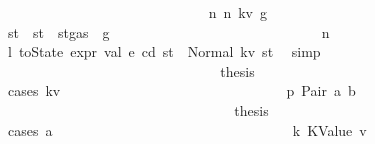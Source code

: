\begin{isabellebody}
\ \ \ \ \ \ \ \ \ \ \ \ \ \ \ \ \ \ \ \ \ \ \ \ \ \ \ \ \isamarkupfalse%
\ n{}{\isacharcolon}{\kern0pt}\ {\isacharparenleft}{\kern0pt}n\ kv\ g{\isacharprime}{\kern0pt}{\isacharprime}{\kern0pt}{\isacharparenright}{\kern0pt}\isanewline
\ \ \ \ \ \ \ \ \ \ \ \ \ \ \ \ \ \ \ \ \ \ \ \ \ \ \ \ \isamarkupfalse%
\ st{\isacharprime}{\kern0pt}{\isacharprime}{\kern0pt}{\isacharprime}{\kern0pt}\ \ {\isachardoublequoteopen}st{\isacharprime}{\kern0pt}{\isacharprime}{\kern0pt}{\isacharprime}{\kern0pt}\ {\isacharequal}{\kern0pt}\ st{\isacharprime}{\kern0pt}{\isacharprime}{\kern0pt}{\isasymlparr}gas\ {\isacharcolon}{\kern0pt}{\isacharequal}{\kern0pt}\ g{\isacharprime}{\kern0pt}{\isacharprime}{\kern0pt}{\isasymrparr}{\isachardoublequoteclose}\isanewline
\ \ \ \ \ \ \ \ \ \ \ \ \ \ \ \ \ \ \ \ \ \ \ \ \ \ \ \ \isamarkupfalse%
\ n{}\ \isamarkupfalse%
\ l{}{\isacharcolon}{\kern0pt}\ {\isachardoublequoteopen}toState\ {\isacharparenleft}{\kern0pt}expr\ val\ e\ cd{\isacharparenright}{\kern0pt}\ st{\isacharprime}{\kern0pt}{\isacharprime}{\kern0pt}\ {\isacharequal}{\kern0pt}\ Normal\ {\isacharparenleft}{\kern0pt}kv{\isacharcomma}{\kern0pt}\ st{\isacharprime}{\kern0pt}{\isacharprime}{\kern0pt}{\isacharprime}{\kern0pt}{\isacharparenright}{\kern0pt}{\isachardoublequoteclose}\ \isamarkupfalse%
\ simp\isanewline
\ \ \ \ \ \ \ \ \ \ \ \ \ \ \ \ \ \ \ \ \ \ \ \ \ \ \ \ \isamarkupfalse%
\ \isamarkupfalse%
\ {\isacharquery}{\kern0pt}thesis\isanewline
\ \ \ \ \ \ \ \ \ \ \ \ \ \ \ \ \ \ \ \ \ \ \ \ \ \ \ \ \isamarkupfalse%
\ {\isacharparenleft}{\kern0pt}cases\ kv{\isacharparenright}{\kern0pt}\isanewline
\ \ \ \ \ \ \ \ \ \ \ \ \ \ \ \ \ \ \ \ \ \ \ \ \ \ \ \ \ \ \isamarkupfalse%
\ p{}{\isacharcolon}{\kern0pt}\ {\isacharparenleft}{\kern0pt}Pair\ a\ b{\isacharparenright}{\kern0pt}\isanewline
\ \ \ \ \ \ \ \ \ \ \ \ \ \ \ \ \ \ \ \ \ \ \ \ \ \ \ \ \ \ \isamarkupfalse%
\ \isamarkupfalse%
\ {\isacharquery}{\kern0pt}thesis\isanewline
\ \ \ \ \ \ \ \ \ \ \ \ \ \ \ \ \ \ \ \ \ \ \ \ \ \ \ \ \ \ \isamarkupfalse%
\ {\isacharparenleft}{\kern0pt}cases\ a{\isacharparenright}{\kern0pt}\isanewline
\ \ \ \ \ \ \ \ \ \ \ \ \ \ \ \ \ \ \ \ \ \ \ \ \ \ \ \ \ \ \ \ \isamarkupfalse%
\ k{}{\isacharcolon}{\kern0pt}\ {\isacharparenleft}{\kern0pt}KValue\ v{\isacharparenright}{\kern0pt}\isanewline
\ \ \ \ \ \ \ \ \ \ \ \ \ \ \ \ \ \ \ \ \ \ \ \ \ \ \ \ \ \ \ \ \isamarkupfalse%

\end{isabellebody}
